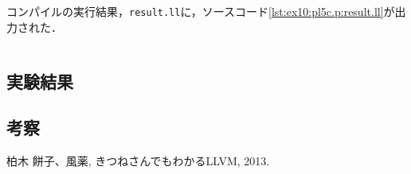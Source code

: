 \documentclass[uplatex]{jsarticle}
\begin{document}
コンパイルの実行結果，\verb#result.ll#に，ソースコード\ref{lst:ex10:pl5c.p:result.ll}が出力された．
\begin{lstlisting}[caption=result.ll,label=lst:ex10:pl5c.p:result.ll]

\end{lstlisting}

\subsection{実験結果}

\subsection{考察}


\begin{thebibliography}{9}
   柏木 餅子、風薬, きつねさんでもわかるLLVM, 2013.
\end{thebibliography}
\end{document}

